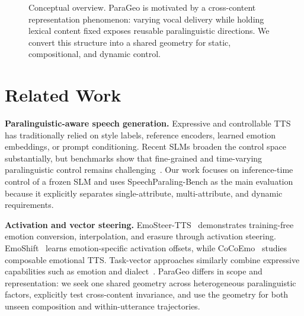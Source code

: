 \documentclass{article}
\begin{document}
\begin{figure}[t]
\centering
{}
\caption{Conceptual overview. ParaGeo is motivated by a cross-content representation phenomenon: varying vocal delivery while holding lexical content fixed exposes reusable paralinguistic directions. We convert this structure into a shared geometry for static, compositional, and dynamic control.}
\label{fig:overview}
\end{figure}

\section{Related Work}
\textbf{Paralinguistic-aware speech generation.} Expressive and controllable TTS has traditionally relied on style labels, reference encoders, learned emotion embeddings, or prompt conditioning. Recent SLMs broaden the control space substantially, but benchmarks show that fine-grained and time-varying paralinguistic control remains challenging~\cite{liu2026speechparaling}. Our work focuses on inference-time control of a frozen SLM and uses SpeechParaling-Bench as the main evaluation because it explicitly separates single-attribute, multi-attribute, and dynamic requirements.

\textbf{Activation and vector steering.} EmoSteer-TTS~\cite{xie2025emosteer} demonstrates training-free emotion conversion, interpolation, and erasure through activation steering. EmoShift~\cite{zhou2026emoshift} learns emotion-specific activation offsets, while CoCoEmo~\cite{wang2026cocoemo} studies composable emotional TTS. Task-vector approaches similarly combine expressive capabilities such as emotion and dialect~\cite{feng2025taskvector}. ParaGeo differs in scope and representation: we seek one shared geometry across heterogeneous paralinguistic factors, explicitly test cross-content invariance, and use the geometry for both unseen composition and within-utterance trajectories.
\end{document}
